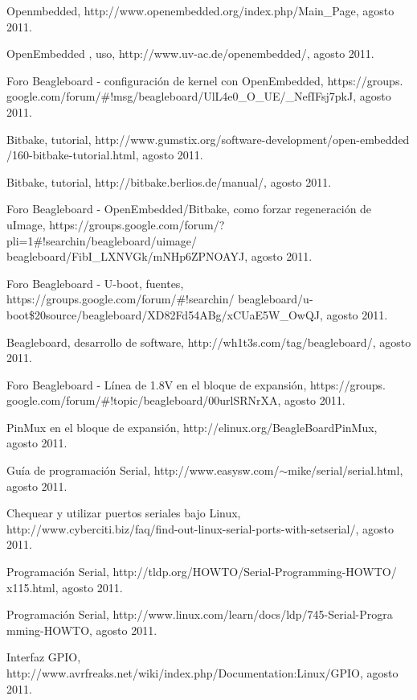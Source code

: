 \begin{thebibliography}{200}
\bibitem{} Openmbedded, http://www.openembedded.org/index.php/Main\_Page, agosto 2011.

\bibitem{} OpenEmbedded , uso, http://www.uv-ac.de/openembedded/, agosto 2011.

\bibitem{} Foro Beagleboard - configuración de kernel con OpenEmbedded, https://groups.
google.com/forum/\#!msg/beagleboard/UlL4e0\_O\_UE/\_NefIFsj7pkJ, agosto 2011.

\bibitem{} Bitbake, tutorial, http://www.gumstix.org/software-development/open-embedded
/160-bitbake-tutorial.html, agosto 2011.

\bibitem{} Bitbake, tutorial, http://bitbake.berlios.de/manual/, agosto 2011.

\bibitem{} Foro Beagleboard - OpenEmbedded/Bitbake, como forzar regeneración de \\
uImage, https://groups.google.com/forum/?pli=1\#!searchin/beagleboard/uimage/
beagleboard/FibI\_LXNVGk/mNHp6ZPNOAYJ, agosto 2011.

\bibitem{} Foro Beagleboard - U-boot, fuentes, https://groups.google.com/forum/\#!searchin/
beagleboard/u-boot\$20source/beagleboard/XD82Fd54ABg/xCUaE5W\_OwQJ, agosto 2011.

\bibitem{} Beagleboard, desarrollo de software, http://wh1t3s.com/tag/beagleboard/, agosto 2011.

\bibitem{} Foro Beagleboard - Línea de 1.8V en el bloque de expansión, https://groups.\\
google.com/forum/\#!topic/beagleboard/00urlSRNrXA, agosto 2011.

\bibitem{} PinMux en el bloque de expansión, http://elinux.org/BeagleBoardPinMux, agosto 2011.

\bibitem{} Guía de programación Serial, http://www.easysw.com/$\sim$mike/serial/serial.html, agosto 2011.

\bibitem{} Chequear y utilizar puertos seriales bajo Linux, http://www.cyberciti.biz/faq/find-out-linux-serial-ports-with-setserial/, agosto 2011.

\bibitem{} Programación Serial, http://tldp.org/HOWTO/Serial-Programming-HOWTO/\\
x115.html, agosto 2011.

\bibitem{} Programación Serial, http://www.linux.com/learn/docs/ldp/745-Serial-Progra\\
mming-HOWTO, agosto 2011.

\bibitem{} Interfaz GPIO, http://www.avrfreaks.net/wiki/index.php/Documentation:Linux/GPIO, agosto 2011.


\end{thebibliography}
